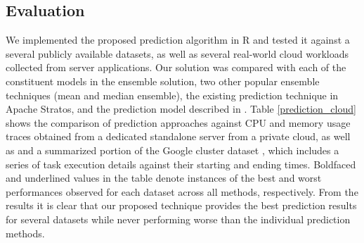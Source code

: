 \subsection{Evaluation}

We implemented the proposed prediction algorithm in R and tested it against a several publicly available datasets, as well as several real-world cloud workloads \cite{AutoscaleAnalyser} collected from server applications. Our solution was compared with each of the constituent models in the ensemble solution, two other popular ensemble techniques (mean and median ensemble), the existing prediction technique in Apache Stratos, and the prediction model described in \cite{Roy_2011}. Table \ref{prediction_cloud} shows the comparison of prediction approaches against CPU and memory usage traces obtained from a dedicated standalone server from a private cloud, as well as and a summarized portion of the Google cluster dataset \cite{GoogleClusterData}, which includes a series of task execution details against their starting and ending times. Boldfaced and underlined values in the table denote instances of the best and worst performances observed for each dataset across all methods, respectively. From the results it is clear that our proposed technique provides the best prediction results for several datasets while never performing worse than the individual prediction methods.\\

